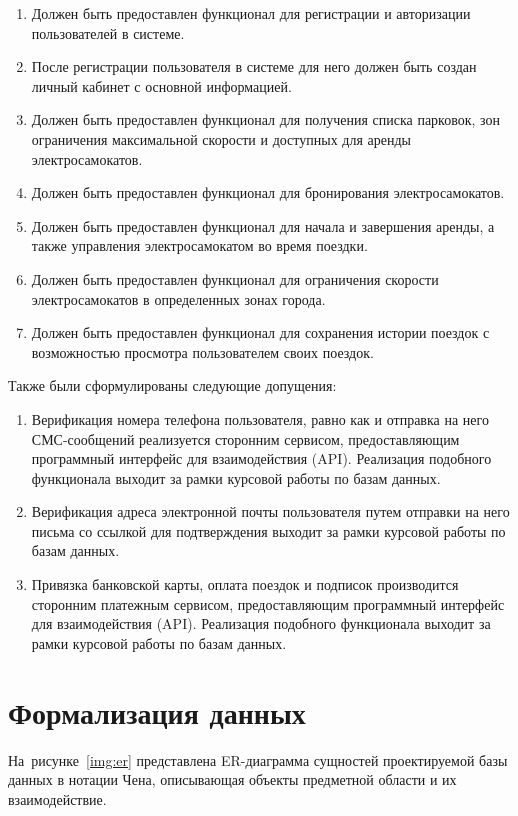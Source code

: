 \begin{enumerate}
	\item Должен быть предоставлен функционал для регистрации и авторизации пользователей в системе.
	\item После регистрации пользователя в системе для него должен быть создан личный кабинет с основной информацией.
	\item Должен быть предоставлен функционал для получения списка парковок, зон ограничения максимальной скорости и доступных для аренды электросамокатов.
	\item Должен быть предоставлен функционал для бронирования электросамокатов.
	\item Должен быть предоставлен функционал для начала и завершения аренды, а также управления электросамокатом во время поездки.
	\item Должен быть предоставлен функционал для ограничения скорости электросамокатов в определенных зонах города.
	\item Должен быть предоставлен функционал для сохранения истории поездок с возможностью просмотра пользователем своих поездок.
\end{enumerate}

Также были сформулированы следующие допущения:

\begin{enumerate}
	\item Верификация номера телефона пользователя, равно как и отправка на него СМС-сообщений реализуется сторонним сервисом, предоставляющим программный интерфейс для взаимодействия (API). Реализация подобного функционала выходит за рамки курсовой работы по базам данных.
	\item Верификация адреса электронной почты пользователя путем отправки на него письма со ссылкой для подтверждения выходит за рамки курсовой работы по базам данных.
	\item Привязка банковской карты, оплата поездок и подписок производится сторонним платежным сервисом, предоставляющим программный интерфейс для взаимодействия (API). Реализация подобного функционала выходит за рамки курсовой работы по базам данных.
\end{enumerate}

\pagebreak
\section{Формализация данных}

На~рисунке~\ref{img:er} представлена ER-диаграмма сущностей проектируемой базы данных в нотации Чена, описывающая объекты предметной области и их взаимодействие.

